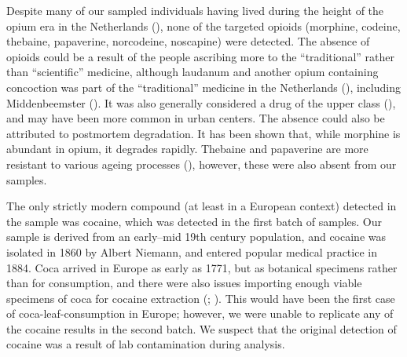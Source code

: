 \documentclass[
  b5paper,
]{book}
\begin{document}
Despite many of our sampled individuals having lived during the height
of the opium era in the Netherlands
(), none of the
targeted opioids (morphine, codeine, thebaine, papaverine, norcodeine,
noscapine) were detected. The absence of opioids could be a result of
the people ascribing more to the ``traditional'' rather than
``scientific'' medicine, although laudanum and another opium containing
concoction was part of the ``traditional'' medicine in the Netherlands
(), including Middenbeemster (). It was also generally considered a drug of the upper class
(), and may have
been more common in urban centers. The absence could also be attributed
to postmortem degradation. It has been shown that, while morphine is
abundant in opium, it degrades rapidly. Thebaine and papaverine are more
resistant to various ageing processes
(),
however, these were also absent from our samples.

The only strictly modern compound (at least in a European context)
detected in the sample was cocaine, which was detected in the first
batch of samples. Our sample is derived from an early--mid 19th century
population, and cocaine was isolated in 1860 by Albert Niemann, and
entered popular medical practice in 1884. Coca arrived in Europe as
early as 1771, but as botanical specimens rather than for consumption,
and there were also issues importing enough viable specimens of coca for
cocaine extraction (; ).
This would have been the first case of coca-leaf-consumption in Europe;
however, we were unable to replicate any of the cocaine results in the
second batch. We suspect that the original detection of cocaine was a
result of lab contamination during analysis.
\end{document}
